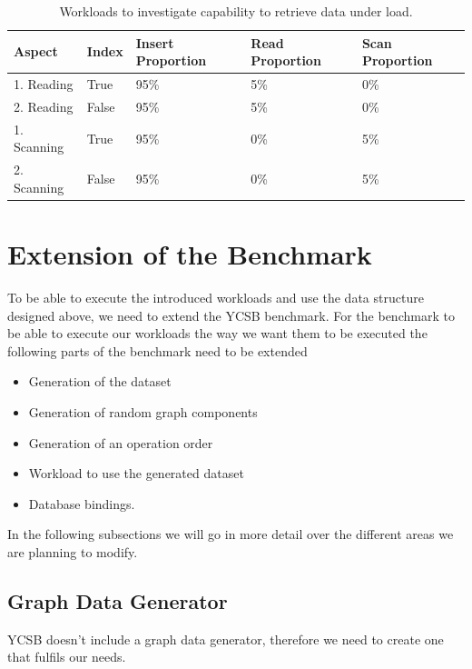 \begin{table}[!h]
  \begin{minipage}{\textwidth}
    \begin{tabularx}{\textwidth}{ | X | X | X | X | X | }
      \hline
      Aspect & Index & Insert Proportion & Read Proportion & Scan Proportion \\ \hline
      1. Reading & True & 95\% & 5\% & 0\% \\ \hline
      2. Reading & False & 95\% & 5\% & 0\% \\ \hline
      1. Scanning & True & 95\% & 0\% & 5\% \\ \hline
      2. Scanning & False & 95\% & 0\% & 5\% \\ \hline
    \end{tabularx}
  \end{minipage}
  \caption{Workloads to investigate capability to retrieve data under load.}
  \label{tab:retrievingUnderLoad}
\end{table}

\pagebreak

\section{Extension of the Benchmark}
\label{ch:design:se:extensionOfTheBenchmark}
To be able to execute the introduced workloads and use the data structure designed above,
we need to extend the YCSB benchmark.
For the benchmark to be able to execute our workloads the way we want them to be executed the following parts of the benchmark need to be extended

\begin{itemize}
  \item Generation of the dataset
  \item Generation of random graph components
  \item Generation of an operation order
  \item Workload to use the generated dataset
  \item Database bindings.
\end{itemize}

In the following subsections we will go in more detail over the different areas we are planning to modify.

\subsection{Graph Data Generator}
YCSB doesn't include a graph data generator,
therefore we need to create one that fulfils our needs.

